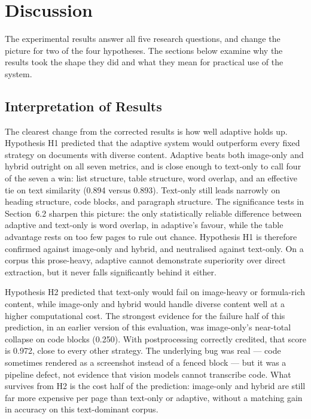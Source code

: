 \chapter{Discussion}

The experimental results answer all five research questions, and change the
picture for two of the four hypotheses. The sections below examine why the
results took the shape they did and what they mean for practical use of the
system.

\section{Interpretation of Results}

The clearest change from the corrected results is how well adaptive holds
up. Hypothesis H1 predicted that the adaptive system would outperform every
fixed strategy on documents with diverse content. Adaptive beats both
image-only and hybrid outright on all seven metrics, and is close enough to
text-only to call four of the seven a win: list structure, table structure,
word overlap, and an effective tie on text similarity (0.894 versus 0.893).
Text-only still leads narrowly on heading structure, code blocks, and
paragraph structure. The significance tests in Section~6.2 sharpen this
picture: the only statistically reliable difference between adaptive and
text-only is word overlap, in adaptive's favour, while the table advantage
rests on too few pages to rule out chance. Hypothesis H1 is therefore
confirmed against image-only and hybrid, and neutralised against text-only.
On a corpus this prose-heavy, adaptive cannot demonstrate superiority over
direct extraction, but it never falls significantly behind it either.

Hypothesis H2 predicted that text-only would fail on image-heavy or
formula-rich content, while image-only and hybrid would handle diverse
content well at a higher computational cost. The strongest evidence for the
failure half of this prediction, in an earlier version of this evaluation,
was image-only's near-total collapse on code blocks (0.250). With
postprocessing correctly credited, that score is 0.972, close to every other
strategy. The underlying bug was real --- code sometimes rendered as a
screenshot instead of a fenced block --- but it was a pipeline defect, not
evidence that vision models cannot transcribe code. What survives from H2 is
the cost half of the prediction: image-only and hybrid are still far more
expensive per page than text-only or adaptive, without a matching gain in
accuracy on this text-dominant corpus.


